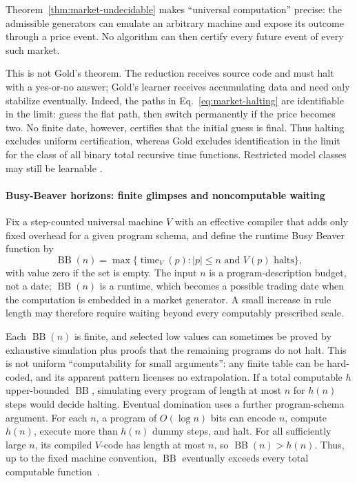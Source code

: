 \documentclass[aps,pra,reprint,superscriptaddress,amsmath,amssymb,floatfix]{revtex4-2}
\theoremstyle{plain}
\theoremstyle{definition}
\theoremstyle{remark}
\begin{document}
Theorem~\ref{thm:market-undecidable} makes ``universal computation'' precise:
the admissible generators can emulate an arbitrary machine and expose its
outcome through a price event. No algorithm can then certify every future
event of every such market.

This is not Gold's theorem. The reduction receives source code and must halt
with a yes-or-no answer; Gold's learner receives accumulating data and need
only stabilize eventually. Indeed, the paths in
Eq.~\eqref{eq:market-halting} are identifiable in the limit: guess the flat
path, then switch permanently if the price becomes two. No finite date,
however, certifies that the initial guess is final. Thus halting excludes
uniform certification, whereas Gold excludes identification in the limit for
the class of all binary total recursive time functions. Restricted model
classes may still be learnable
\cite{blum75blum,angluin:83,ad-91,2016-AlexanderKarlSvozil-ml,moore}.

\paragraph{Busy-Beaver horizons: finite glimpses and noncomputable waiting}

Fix a step-counted universal machine \(V\) with an effective compiler that adds
only fixed overhead for a given program schema, and define the runtime Busy
Beaver function by
\begin{equation}
  \operatorname{BB}(n)
  =
  \max\{\operatorname{time}_V(p):
  |p|\leq n\text{ and }V(p)\text{ halts}\},
  \label{eq:busybeaver}
\end{equation}
with value zero if the set is empty. The input \(n\) is a program-description
budget, not a date; \(\operatorname{BB}(n)\) is a runtime, which becomes a
possible trading date when the computation is embedded in a market generator.
A small increase in rule length may therefore require waiting beyond every
computably prescribed scale.

Each \(\operatorname{BB}(n)\) is finite, and selected low values can sometimes
be proved by exhaustive simulation plus proofs that the remaining programs do
not halt. This is not uniform ``computability for small arguments'': any finite
table can be hard-coded, and its apparent pattern licenses no extrapolation. If
a total computable \(h\) upper-bounded \(\operatorname{BB}\), simulating every
program of length at most \(n\) for \(h(n)\) steps would decide halting.
Eventual domination uses a further program-schema argument. For each \(n\), a
program of \(O(\log n)\) bits can encode \(n\), compute \(h(n)\), execute more
than \(h(n)\) dummy steps, and halt. For all sufficiently large \(n\), its
compiled \(V\)-code has length at most \(n\), so
\(\operatorname{BB}(n)>h(n)\). Thus, up to the fixed machine convention,
\(\operatorname{BB}\) eventually exceeds every total computable
function~\cite{rado,chaitin-bb}.
\end{document}
